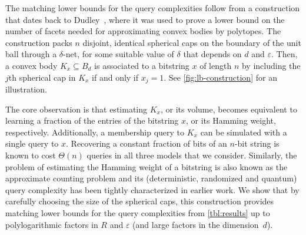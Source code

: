 \documentclass[11pt]{article}
\newcommand{\eps}{\varepsilon}
\begin{document}
    The matching lower bounds for the query complexities follow from a construction that dates back to Dudley~\cite{dudley1974metric}, where it was used to prove a lower bound on the number of facets needed for approximating convex bodies by polytopes. The construction packs $n$ disjoint, identical spherical caps on the boundary of the unit ball through a $\delta$-net, for some suitable value of $\delta$ that depends on $d$ and $\eps$. Then, a convex body $K_x \subseteq B_d$ is associated to a bitstring $x$ of length $n$ by including the $j$th spherical cap in $K_x$ if and only if $x_j = 1$. See \cref{fig:lb-construction} for an illustration.

    The core observation is that estimating $K_x$, or its volume, becomes equivalent to learning a fraction of the entries of the bitstring $x$, or its Hamming weight, respectively. Additionally, a membership query to $K_x$ can be simulated with a single query to $x$. Recovering a constant fraction of bits of an $n$-bit string is known to cost $\Theta(n)$ queries in all three models that we consider. Similarly, the problem of estimating the Hamming weight of a bitstring is also known as the approximate counting problem and its (deterministic, randomized and quantum) query complexity has been tightly characterized in earlier work. We show that by carefully choosing the size of the spherical caps, this construction provides matching lower bounds for the query complexities from \cref{tbl:results} up to polylogarithmic factors in $R$ and $\varepsilon$ (and large factors in the dimension~$d$).
\end{document}

